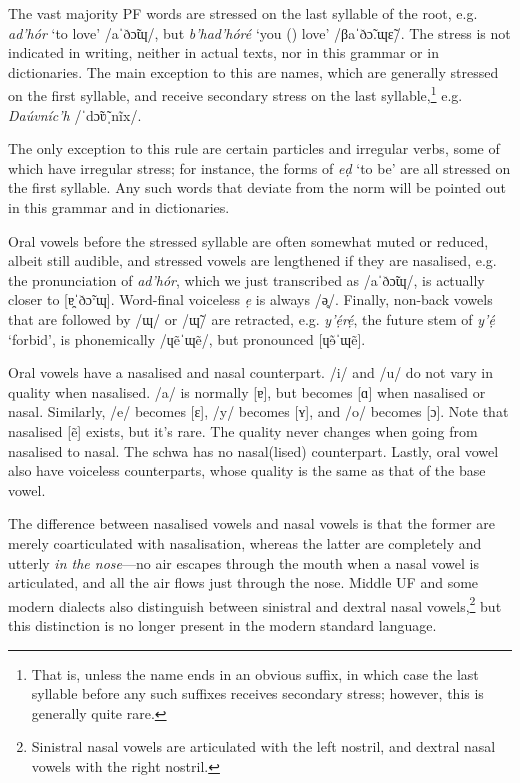 \documentclass[a4paper, 12pt, twoside, openright, final]{book}
\let \w \textit
\begin{document}
The vast majority PF words are stressed on the last syllable of the root, e.g. \w{ad’hór} ‘to love’ /aˈðɔ̃ɰ/, but \w{b’had’hóré}
‘you () love’ /βaˈðɔ̃.ɰɛ̃/. The stress is not indicated in writing, neither in actual texts, nor in this
grammar or in dictionaries. The main exception to this are names, which are generally stressed on the first syllable,
and receive secondary stress on the last syllable,\footnote{That is, unless the name ends in an obvious suffix, in which case the last
syllable before any such suffixes receives secondary stress; however, this is generally quite rare.} e.g. \w{Daúvníc’h} /ˈdɔ̃ʋ̃ˌnĩx/.

The only exception to this rule are certain particles and irregular verbs, some of which have irregular stress; for instance,
the forms of \w{eḍ} ‘to be’ are all stressed on the first syllable. Any such words that deviate from the norm will be pointed
out in this grammar and in dictionaries.

Oral vowels before the stressed syllable are often somewhat muted or reduced, albeit still audible, and stressed vowels are lengthened if they
are nasalised, e.g. the pronunciation of \w{ad’hór}, which we just transcribed as /aˈðɔ̃ɰ/, is actually closer to [ɐ̯ˈðɔ̃ˑɰ].
Word-final voiceless \w{ẹ} is always /ə̥/. Finally, non-back vowels that are followed by /ɰ/ or /ɰ̃/ are retracted, e.g. \w{y’ẹ́rẹ́}, the future
stem of \w{y’ẹ́} ‘forbid’, is phonemically /ɥẽˈɰẽ/, but pronounced [ɥɘ̃ˈɰẽ].

Oral vowels have a nasalised and nasal counterpart. /i/ and /u/ do not vary in quality when na\-sa\-lis\-ed.
/a/ is normally [ɐ], but becomes [ɑ] when nasalised or nasal. Similarly, /e/ becomes [ɛ],
/y/ becomes [ʏ], and /o/ becomes [ɔ]. Note that nasalised [ẽ] exists, but it’s
rare. The quality never changes when going from nasalised to nasal. The schwa has no nasal(lised) counterpart. Lastly, oral vowel
also have voiceless counterparts, whose quality is the same as that of the base vowel.

The difference between nasalised vowels and nasal vowels is that the former are merely coarticulated with nasalisation, whereas
the latter are completely and utterly \textit{in the nose}—no air escapes through the mouth when a nasal vowel is articulated, and all
the air flows just through the nose. Middle UF and some modern dialects also distinguish between sinistral and dextral nasal
vowels,\footnote{Sinistral nasal vowels are articulated with the left nostril, and dextral nasal vowels with the right nostril.}
but this distinction is no longer present in the modern standard language.
\end{document}
